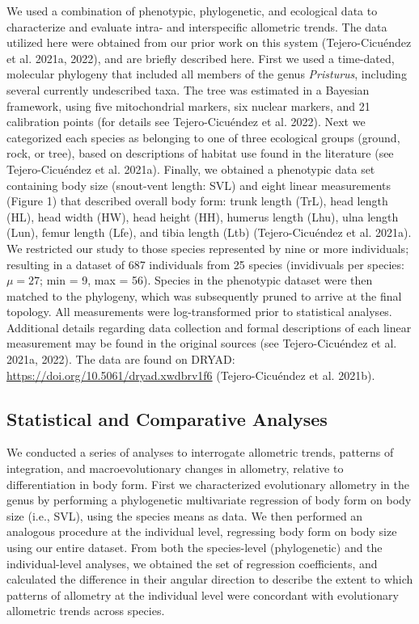 \documentclass[
  11pt,
]{article}
\begin{document}
We used a combination of phenotypic, phylogenetic, and ecological data
to characterize and evaluate intra- and interspecific allometric trends.
The data utilized here were obtained from our prior work on this system
(Tejero-Cicuéndez et al. 2021a, 2022), and are briefly described here.
First we used a time-dated, molecular phylogeny that included all
members of the genus \emph{Pristurus}, including several currently
undescribed taxa. The tree was estimated in a Bayesian framework, using
five mitochondrial markers, six nuclear markers, and 21 calibration
points (for details see Tejero-Cicuéndez et al. 2022). Next we
categorized each species as belonging to one of three ecological groups
(ground, rock, or tree), based on descriptions of habitat use found in
the literature (see Tejero-Cicuéndez et al. 2021a). Finally, we obtained
a phenotypic data set containing body size (snout-vent length: SVL) and
eight linear measurements (Figure 1) that described overall body form:
trunk length (TrL), head length (HL), head width (HW), head height (HH),
humerus length (Lhu), ulna length (Lun), femur length (Lfe), and tibia
length (Ltb) (Tejero-Cicuéndez et al. 2021a). We restricted our study to
those species represented by nine or more individuals; resulting in a
dataset of 687 individuals from 25 species (invidivuals per species:
\(\mu=27\); min = 9, max = 56). Species in the phenotypic dataset were
then matched to the phylogeny, which was subsequently pruned to arrive
at the final topology. All measurements were log-transformed prior to
statistical analyses. Additional details regarding data collection and
formal descriptions of each linear measurement may be found in the
original sources (see Tejero-Cicuéndez et al. 2021a, 2022). The data are
found on DRYAD: \url{https://doi.org/10.5061/dryad.xwdbrv1f6}
(Tejero-Cicuéndez et al. 2021b).

\hypertarget{statistical-and-comparative-analyses}{%
\subsection{Statistical and Comparative
Analyses}\label{statistical-and-comparative-analyses}}

We conducted a series of analyses to interrogate allometric trends,
patterns of integration, and macroevolutionary changes in allometry,
relative to differentiation in body form. First we characterized
evolutionary allometry in the genus by performing a phylogenetic
multivariate regression of body form on body size (i.e., SVL), using the
species means as data. We then performed an analogous procedure at the
individual level, regressing body form on body size using our entire
dataset. From both the species-level (phylogenetic) and the
individual-level analyses, we obtained the set of regression
coefficients, and calculated the difference in their angular direction
to describe the extent to which patterns of allometry at the individual
level were concordant with evolutionary allometric trends across
species. \hfill\break
\end{document}
